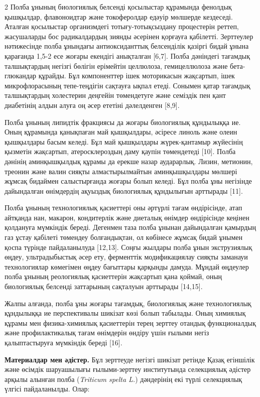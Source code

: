 \begin{multicols}{2}
Полба ұнының биологиялық белсенді қосылыстар құрамында фенолдық
қышқылдар, флавоноидтар және токоферолдар едәуір мөлшерде кездеседі.
Аталған қосылыстар организмдегі тотығу-тотықсыздану процестерін реттеп,
жасушаларды бос радикалдардың зиянды әсерінен қорғауға қабілетті.
Зерттеулер нәтижесінде полба ұнындағы антиоксиданттық белсенділік
қазіргі бидай ұнына қарағанда 1,5-2 есе жоғары екендігі анықталған
{[}6,7{]}. Полба дәніндегі тағамдық талшықтардың негізгі бөлігін
ерімейтін целлюлоза, гемицеллюлоза және бета-глюкандар құрайды. Бұл
компоненттер ішек моторикасын жақсартып, ішек микрофлорасының
тепе-теңдігін сақтауға ықпал етеді. Сонымен қатар тағамдық талшықтардың
холестерин деңгейін төмендетуге және семіздік пен қант диабетінің алдын
алуға оң әсер ететіні дәлелденген {[}8,9{]}.

Полба ұнының липидтік фракциясы да жоғары биологиялық құндылыққа ие.
Оның құрамында қанықпаған май қышқылдары, әсіресе линоль және олеин
қышқылдары басым келеді. Бұл май қышқылдары жүрек-қантамыр жүйесінің
қызметін жақсартып, атеросклероздың даму қаупін төмендетеді {[}10{]}.
Полба дәнінің аминқышқылдық құрамы да ерекше назар аударарлық. Лизин,
метионин, треонин және валин сияқты алмастырылмайтын аминқышқылдары
мөлшері жұмсақ бидаймен салыстырғанда жоғары болып келеді. Бұл полба ұны
негізінде дайындалған өнімдердің ақуыздық биологиялық құндылығын
арттырады {[}11{]}.

Полба ұнының технологиялық қасиеттері оны әртүрлі тағам өндірісінде,
атап айтқанда нан, макарон, кондитерлік және диеталық өнімдер
өндірісінде кеңінен қолдануға мүмкіндік береді. Дегенмен таза полба
ұнынан дайындалған қамырдың газ ұстау қабілеті төмендеу болғандықтан, ол
көбінесе жұмсақ бидай ұнымен қоспа түрінде пайдаланылуда {[}12,13{]}.
Соңғы жылдары полба ұнын экструзиялық өңдеу, ультрадыбыстық әсер ету,
ферменттік модификациялау сияқты заманауи технологиялар көмегімен өңдеу
бағыттары қарқынды дамуда. Мұндай өңдеулер полба ұнының реологиялық
қасиеттерін жақсартып қана қоймай, оның биологиялық белсенді заттарының
сақталуын арттырады {[}14,15{]}.

Жалпы алғанда, полба ұны жоғары тағамдық, биологиялық және технологиялық
құндылыққа ие перспективалы шикізат көзі болып табылады. Оның химиялық
құрамы мен физика-химиялық қасиеттерін терең зерттеу отандық
функционалдық және профилактикалық тағам өнімдерін өндіру үшін ғылыми
негіз қалыптастыруға мүмкіндік береді {[}16{]}.

{\bfseries Материалдар мен әдістер.} Бұл зерттеуде негізгі шикізат ретінде
Қазақ егіншілік және өсімдік шаруашылығы ғылыми-зерттеу институтында
селекциялық әдістер арқылы алынған полба (\emph{Triticum spelta L.})
дәндерінің екі түрлі селекциялық үлгісі пайдаланылды. Олар:


\end{multicols}

